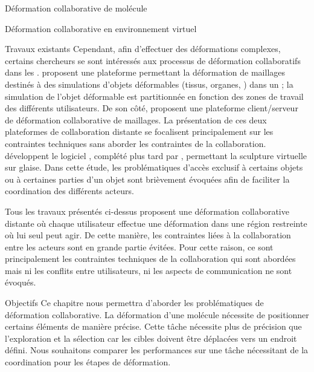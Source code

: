 \documentclass[myfrancais,ngerman,english,french]{mythesis}
\begin{document}
\begin{mychapter}{Déformation collaborative de molécule}
\begin{mysection}{Déformation collaborative en environnement virtuel}
\begin{mysubsection}{Travaux existants}
				Cependant, afin d'effectuer des déformations complexes, certains chercheurs se sont intéressés aux processus de déformation collaboratifs dans les .
				 proposent une plateforme permettant la déformation de maillages destinés à des simulations d'objets déformables (tissus, organes, \myetc) dans un ; la simulation de l'objet déformable est partitionnée en fonction des zones de travail des différents utilisateurs.
				De son côté,  proposent une plateforme client/serveur de déformation collaborative de maillages.
				La présentation de ces deux plateformes de collaboration distante se focalisent principalement sur les contraintes techniques sans aborder les contraintes de la collaboration.
				 développent le logiciel \myClayWorks, complété plus tard par , permettant la sculpture virtuelle sur glaise.
				Dans cette étude, les problématiques d'accès exclusif à certains objets ou à certaines parties d'un objet sont brièvement évoquées afin de faciliter la coordination des différents acteurs.

				Tous les travaux présentés ci-dessus proposent une déformation collaborative distante où chaque utilisateur effectue une déformation dans une région restreinte où lui seul peut agir.
				De cette manière, les contraintes liées à la collaboration entre les acteurs sont en grande partie évitées.
				Pour cette raison, ce sont principalement les contraintes techniques de la collaboration qui sont abordées mais ni les conflits entre utilisateurs, ni les aspects de communication ne sont évoqués.
			\end{mysubsection}
			\begin{mysubsection}{Objectifs}
				Ce chapitre nous permettra d'aborder les problématiques de déformation collaborative.
				La déformation d'une molécule nécessite de positionner certains éléments de manière précise.
				Cette tâche nécessite plus de précision que l'exploration et la sélection car les cibles doivent être déplacées vers un endroit défini.
				Nous souhaitons comparer les performances sur une tâche nécessitant de la coordination pour les étapes de déformation.


\end{mysubsection}
\end{mysection}
\end{mychapter}
\end{document}

